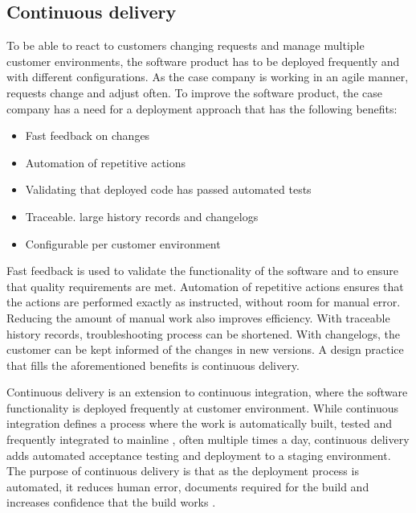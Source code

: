\documentclass[english]{tktltiki2}
\theoremstyle{definition}
\theoremstyle{remark}
\begin{document}



\subsection{Continuous delivery}

To be able to react to customers changing requests and manage multiple customer environments, the software product has to be deployed frequently and with different configurations. As the case company is working in an agile manner, requests change and adjust often. To improve the software product, the case company has a need for a deployment approach that has the following benefits:

\begin{itemize}
\item Fast feedback on changes
\item Automation of repetitive actions
\item Validating that deployed code has passed automated tests 
\item Traceable. large history records and changelogs
\item Configurable per customer environment
\end{itemize}

Fast feedback is used to validate the functionality of the software and to ensure that quality requirements are met. Automation of repetitive actions ensures that the actions are performed exactly as instructed, without room for manual error. Reducing the amount of manual work also improves efficiency. With traceable history records, troubleshooting process can be shortened. With changelogs, the customer can be kept informed of the changes in new versions. A design practice that fills the aforementioned benefits is continuous delivery.

Continuous delivery is an extension to continuous integration, where the software functionality is deployed frequently at customer environment. While continuous integration defines a process where the work is automatically built, tested and frequently integrated to mainline \cite{fowler2006continuous}, often multiple times a day, continuous delivery adds automated acceptance testing and deployment to a staging environment. The purpose of continuous delivery is that as the deployment process is automated, it reduces human error, documents required for the build and increases confidence that the build works \cite{cdbook}. 
\end{document}
